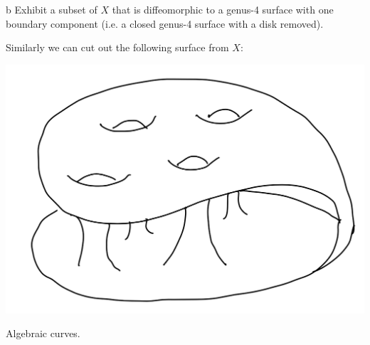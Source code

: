 \documentclass{lkx_pset}
\begin{document}
\begin{solution}
  \begin{part}{b}
    Exhibit a subset of $X$ that is diffeomorphic to a genus-4 surface with one boundary component (i.e. a closed genus-4 surface with a disk removed).
  \end{part}

  Similarly we can cut out the following surface from $X$:
  \begin{center}
    \includegraphics[scale=0.5]{figure3.png}
  \end{center}
\end{solution}

\begin{problem}{3}
  Algebraic curves.
\end{problem}
\end{document}
